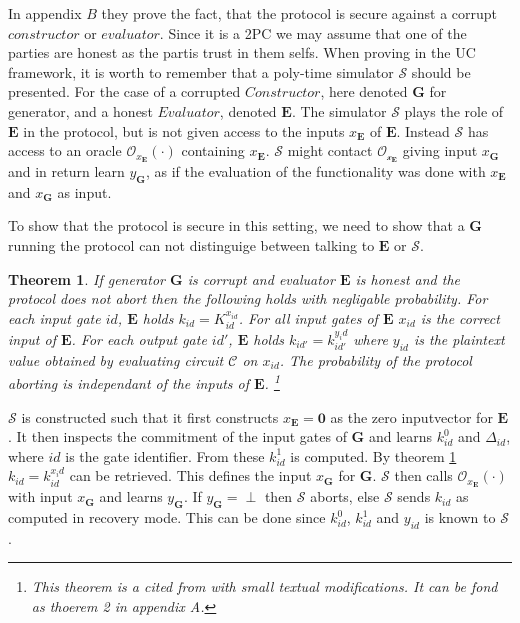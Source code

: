 \documentclass[twoside,11pt,openright]{report}
\newtheorem{theorem}{Theorem}
\begin{document}
In appendix $B$ they prove the fact, that the protocol is secure against a corrupt $constructor$ or $evaluator$. Since it is a 2PC we may assume that one of the parties are honest as the partis trust in them selfs. When proving in the UC framework, it is worth to remember that a poly-time simulator $\mathcal{S}$ should be presented. For the case of a corrupted $Constructor$, here denoted $\mathbf{G}$ for generator, and a honest $Evaluator$, denoted $\mathbf{E}$. The simulator $\mathcal{S}$ plays the role of $\mathbf{E}$ in the protocol, but is not given access to the inputs $x_{\mathbf{E}}$ of $\mathbf{E}$. Instead $\mathcal{S}$ has access to an oracle $\mathcal{O}_{x_{\mathbf{E}}}(\cdot)$ containing $x_{\mathbf{E}}$. $\mathcal{S}$ might contact $\mathcal{O_{x_{\mathbf{E}}}}$ giving input $x_{\mathbf{G}}$ and in return learn $y_{\mathbf{G}}$, as if the evaluation of the functionality was done with $x_{\mathbf{E}}$ and $x_{\mathbf{G}}$ as input.

To show that the protocol is secure in this setting, we need to show that a $\mathbf{G}$ running the protocol can not distinguige between talking to $\mathbf{E}$ or $\mathcal{S}$.

\begin{theorem}
\label{thm:2}
If generator $\mathbf{G}$ is corrupt and evaluator $\mathbf{E}$ is honest and the protocol does not abort then the following holds with negligable probability. For each input gate $id$, $\mathbf{E}$ holds $k_{id}=K^{x_{id}}_{id}$. For all input gates of $\mathbf{E}$ $x_{id}$ is the correct input of $\mathbf{E}$. For each output gate $id'$, $\mathbf{E}$ holds $k_{id'}=k^{y_id}_{id'}$ where $y_{id}$ is the plaintext value obtained by evaluating circuit $\mathcal{C}$ on $x_{id}$. The probability of the protocol aborting is independant of the inputs of $\mathbf{E}$.
\footnote{This theorem is a cited from  with small textual modifications. It can be fond as thoerem 2 in appendix A.}
\end{theorem}

$\mathcal{S}$ is constructed such that it first constructs $x_\mathbf{E}=\mathbf{0}$ as the zero inputvector for $\mathbf{E}$. It then inspects the commitment of the input gates of $\mathbf{G}$ and learns $k^0_{id}$ and $\Delta_{id}$, where $id$ is the gate identifier. From these $k^1_{id}$ is computed. By theorem \ref{thm:2} $k_{id}=k^{x_id}_{id}$ can be retrieved. This defines the input $x_\mathbf{G}$ for $\mathbf{G}$. $\mathcal{S}$ then calls $\mathcal{O}_{x_\mathbf{E}}(\cdot)$ with input $x_\mathbf{G}$ and learns $y_\mathbf{G}$. If $y_\mathbf{G}=\perp$ then $\mathcal{S}$ aborts, else $\mathcal{S}$ sends $k_{id}$ as computed in recovery mode. This can be done since $k^0_{id}$, $k^1_{id}$ and $y_{id}$ is known to $\mathcal{S}$.
\end{document}
